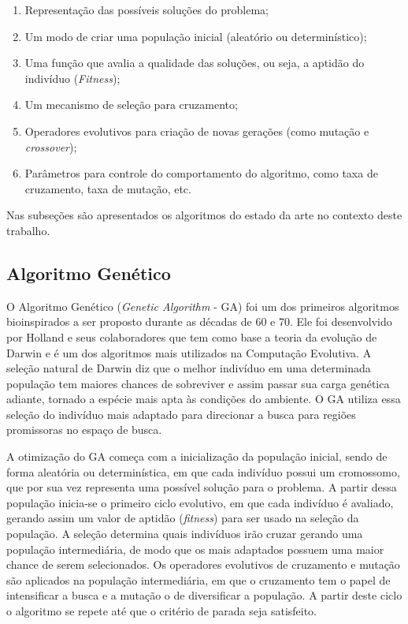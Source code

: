 \begin{enumerate}
\item Representação das possíveis soluções do problema;
\item Um modo de criar uma população inicial (aleatório ou determinístico);
\item Uma função que avalia a qualidade das soluções, ou seja, a aptidão do indivíduo (\textit{Fitness});
\item Um mecanismo de seleção para cruzamento;
\item Operadores evolutivos para criação de novas gerações (como mutação e \textit{crossover});
\item Parâmetros para controle do comportamento do algoritmo, como taxa de cruzamento, taxa de mutação, etc.  
\end{enumerate}

Nas subseções são apresentados os algoritmos do estado da arte no contexto deste trabalho.

\subsection{Algoritmo Genético}
\label{sec:genetic_algorithms}
O Algoritmo Genético (\textit{Genetic Algorithm} - GA) foi um dos primeiros algoritmos bioinspirados a ser proposto durante as décadas de 60 e 70. Ele foi desenvolvido por Holland e seus colaboradores que tem como base a teoria da evolução de Darwin \cite{ga} e é um dos algoritmos mais utilizados na Computação Evolutiva. A seleção natural de Darwin diz que o melhor indivíduo em uma determinada população tem maiores chances de sobreviver e assim passar sua carga genética adiante, tornado a espécie mais apta às condições do ambiente. O GA utiliza essa seleção do indivíduo mais adaptado para direcionar a busca para regiões promissoras no espaço de busca.

A otimização do GA começa com a inicialização da população inicial, sendo de forma aleatória ou determinística, em que cada indivíduo possui um cromossomo, que por sua vez representa uma possível solução para o problema. A partir dessa população inicia-se o primeiro ciclo evolutivo, em que cada indivíduo é avaliado, gerando assim um valor de aptidão (\textit{fitness}) para ser usado na seleção da população. A seleção determina quais indivíduos irão cruzar gerando uma população intermediária, de modo que os mais adaptados possuem uma maior chance de serem selecionados. Os operadores evolutivos de cruzamento e mutação são aplicados na população intermediária, em que o cruzamento tem o papel de intensificar a busca e a mutação o de diversificar a população. A partir deste ciclo o algoritmo se repete até que o critério de parada seja satisfeito.

